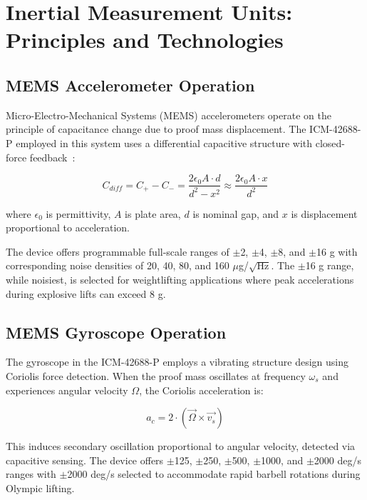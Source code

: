 \section{Inertial Measurement Units: Principles and Technologies}

\subsection{MEMS Accelerometer Operation}

Micro-Electro-Mechanical Systems (MEMS) accelerometers operate on the principle of capacitance change due to proof mass displacement. The ICM-42688-P employed in this system uses a differential capacitive structure with closed-force feedback~\cite{invenSense2020}:

\begin{equation}
    C_{diff} = C_+ - C_- = \frac{2\epsilon_0 A \cdot d}{d^2 - x^2} \approx \frac{2\epsilon_0 A \cdot x}{d^2}
\end{equation}

where $\epsilon_0$ is permittivity, $A$ is plate area, $d$ is nominal gap, and $x$ is displacement proportional to acceleration.

The device offers programmable full-scale ranges of $\pm$2, $\pm$4, $\pm$8, and $\pm$16 g with corresponding noise densities of 20, 40, 80, and 160 $\mu$g/$\sqrt{\text{Hz}}$. The $\pm$16 g range, while noisiest, is selected for weightlifting applications where peak accelerations during explosive lifts can exceed 8 g.

\subsection{MEMS Gyroscope Operation}

The gyroscope in the ICM-42688-P employs a vibrating structure design using Coriolis force detection. When the proof mass oscillates at frequency $\omega_s$ and experiences angular velocity $\Omega$, the Coriolis acceleration is:

\begin{equation}
    a_c = 2 \cdot (\vec{\Omega} \times \vec{v_s})
\end{equation}

This induces secondary oscillation proportional to angular velocity, detected via capacitive sensing. The device offers $\pm$125, $\pm$250, $\pm$500, $\pm$1000, and $\pm$2000 deg/s ranges with $\pm$2000 deg/s selected to accommodate rapid barbell rotations during Olympic lifting.

